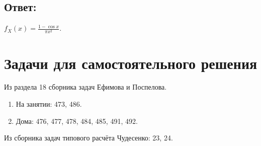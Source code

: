 \subsection*{Ответ:}
$f_X(x) = \frac{1 - \cos x}{\pi x^2}$.

\section*{Задачи для самостоятельного решения}

Из раздела 18 сборника задач Ефимова и Поспелова.
\begin{enumerate}
    \item На занятии: 473, 486.
    \item Дома: 476, 477, 478, 484, 485, 491, 492.
\end{enumerate}

Из сборника задач типового расчёта Чудесенко: 23, 24.